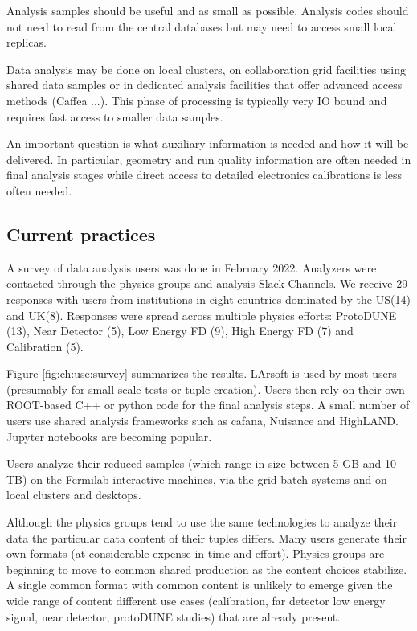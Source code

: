 \documentclass[../main-v1.tex]{subfiles}
\begin{document}
Analysis samples should be useful and as small as possible.  Analysis codes should not need to read from the central databases but may need to access small local replicas. 

Data analysis may be done on local clusters, on collaboration grid facilities using shared data samples or in dedicated analysis facilities that offer advanced access methods (Caffea ...). This phase of processing is typically very IO bound and requires fast access to smaller data samples. 


An important question is what auxiliary information is needed and how it will be delivered. In particular, geometry and run quality information are often needed in final analysis stages while direct access to detailed electronics calibrations is less often needed. 

\subsection{Current practices}

A survey of data analysis users was done in February 2022.  Analyzers were contacted through the physics groups and analysis Slack Channels.  We receive 29 responses with users from institutions in eight countries dominated by the US(14) and UK(8). 
Responses were spread across multiple physics efforts: ProtoDUNE	(13),
Near Detector	(5),
Low Energy FD	(9),
High Energy FD	(7) and 
Calibration	(5).  



Figure \ref{fig:ch:use:survey} summarizes the results.  LArsoft is used by most users (presumably for small scale tests or tuple creation).  Users then rely on their own ROOT-based C++ or python code for the final analysis steps.  A small number of users use shared analysis frameworks such as cafana, Nuisance and HighLAND.  Jupyter notebooks are becoming popular. 

Users analyze their reduced samples (which range in size between 5 GB and 10 TB) on the Fermilab interactive machines, via the grid batch systems and on local clusters and desktops. 


Although the physics groups tend to use the same technologies to analyze their data the particular data content of their tuples differs.  Many users generate their own formats (at considerable expense in time and effort). Physics groups are beginning to move to common shared production as the content choices stabilize.  A single common format with common content is unlikely to emerge given the wide range of content different use cases (calibration, far detector low energy signal, near detector, protoDUNE studies) that are already present.
\end{document}
